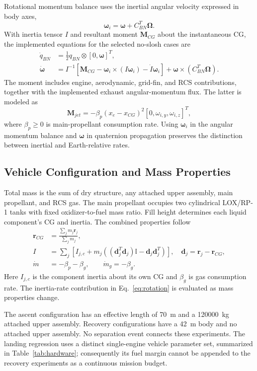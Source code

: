 \documentclass[11pt,letterpaper]{article}
\begin{document}
Rotational momentum balance uses the inertial angular velocity expressed in body axes,
\begin{equation}
\bm\omega_i=\bm\omega+C_{BN}^{T}\bm\Omega.
\end{equation}
With inertia tensor $I$ and resultant moment $\bm M_{CG}$ about the instantaneous CG, the implemented equations for the selected no-slosh cases are
\begin{align}
\dot q_{BN}&=\tfrac12 q_{BN}\otimes[0,\bm\omega]^T,\\
\dot{\bm\omega}&=I^{-1}\!\left[\bm M_{CG}
-\bm\omega_i\times(I\bm\omega_i)-\dot I\bm\omega_i\right]
+\bm\omega\times(C_{BN}^{T}\bm\Omega).\label{eq:rotation}
\end{align}
The moment includes engine, aerodynamic, grid-fin, and RCS contributions, together with the implemented exhaust angular-momentum flux. The latter is modeled as
\begin{equation}
\bm M_{jet}=-\beta_p(x_e-x_{CG})^2[0,\omega_{i,y},\omega_{i,z}]^T,
\end{equation}
where $\beta_p\geq0$ is main-propellant consumption rate. Using $\bm\omega_i$ in the angular momentum balance and $\bm\omega$ in quaternion propagation preserves the distinction between inertial and Earth-relative rates.

\subsection{Vehicle Configuration and Mass Properties}
Total mass is the sum of dry structure, any attached upper assembly, main propellant, and RCS gas. The main propellant occupies two cylindrical LOX/RP-1 tanks with fixed oxidizer-to-fuel mass ratio. Fill height determines each liquid component's CG and inertia. The combined properties follow
\begin{align}
\bm r_{CG}&=\frac{\sum_j m_j\bm r_j}{\sum_jm_j},\\
I&=\sum_j\left[I_{j,c}+m_j\left((\bm d_j^T\bm d_j)\mathbb I-\bm d_j\bm d_j^T\right)\right],
\quad \bm d_j=\bm r_j-\bm r_{CG},\\
\dot m&=-\beta_p-\beta_g,\qquad \dot m_g=-\beta_g.
\end{align}
Here $I_{j,c}$ is the component inertia about its own CG and $\beta_g$ is gas consumption rate. The inertia-rate contribution in Eq.~\eqref{eq:rotation} is evaluated as mass properties change.

The ascent configuration has an effective length of \SI{70}{\metre} and a \SI{120000}{\kilogram} attached upper assembly. Recovery configurations have a \SI{42}{\metre} body and no attached upper assembly. No separation event connects these experiments. The landing regression uses a distinct single-engine vehicle parameter set, summarized in Table~\ref{tab:hardware}; consequently its fuel margin cannot be appended to the recovery experiments as a continuous mission budget.
\end{document}
